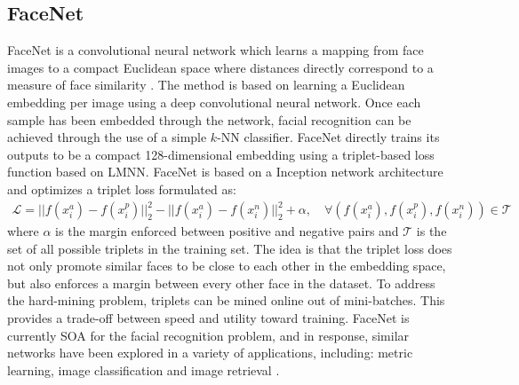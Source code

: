		
		\subsection{FaceNet}
		
		
		FaceNet is a convolutional neural network which learns a mapping from face images to a compact Euclidean space where distances directly correspond to a measure of face similarity \citep{Schroff2015FaceNet}.  The method is based on learning a Euclidean embedding per image using a deep convolutional neural network.  Once each sample has been embedded through the network,  facial recognition can be achieved through the use of a simple $k$-NN classifier.  FaceNet  directly trains its outputs to be a compact 128-dimensional embedding  using a triplet-based loss function based on LMNN. FaceNet is based on a Inception network architecture and  optimizes a triplet loss formulated as:
		\begin{align}
		\mathcal{L} = ||f(x^{a}_{i}) - f(x^{p}_{i})||^{2}_{2} -||f(x^{a}_{i}) - f(x^{n}_{i})||^{2}_{2} + \alpha, \quad \forall (f(x^{a}_{i}),f(x^{p}_{i}),f(x^{n}_{i})) \in \mathcal{T}
		\end{align} 
		where $\alpha$ is the margin enforced between positive and negative pairs and $\mathcal{T}$ is the set of all possible triplets in the training set.  The idea is that the triplet loss does not only promote similar faces to be close to each other in the embedding space, but also enforces a margin between every other face in the dataset.  To address the hard-mining problem,  triplets can be mined online out of mini-batches.  This provides a trade-off between speed and utility toward training.  FaceNet is currently SOA for the facial recognition problem, and in response, similar networks have been explored in a variety of applications, including: metric learning, image classification and image retrieval \citep{Hoffer2015DeepMetricLearning}.
		
		
		
		
		
	
		
	

	
	



